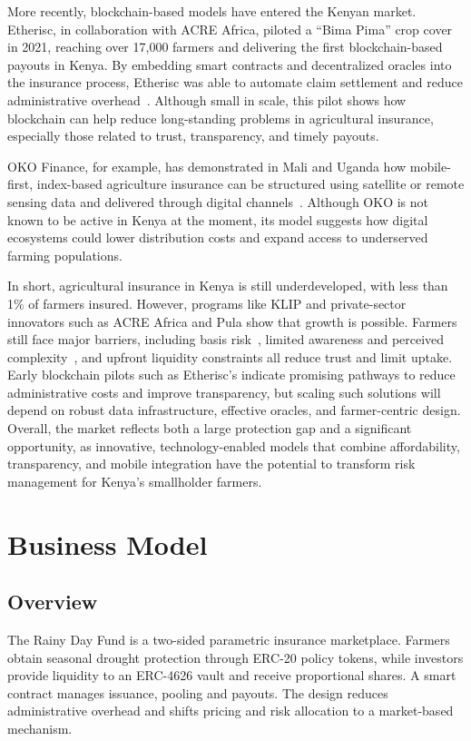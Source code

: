 \documentclass[11pt,a4paper]{article}
\begin{document}
    More recently, blockchain-based models have entered the Kenyan market.
    Etherisc, in collaboration with ACRE Africa, piloted a \enquote{Bima Pima} crop cover in 2021, reaching over 17,000 farmers and delivering the first blockchain-based payouts in Kenya.
    By embedding smart contracts and decentralized oracles into the insurance process, Etherisc was able to automate claim settlement and reduce administrative overhead~\parencite{Etherisc2021}.
    Although small in scale, this pilot shows how blockchain can help reduce long-standing problems in agricultural insurance, especially those related to trust, transparency, and timely payouts.

    OKO Finance, for example, has demonstrated in Mali and Uganda how mobile-first, index-based agriculture insurance can be structured using satellite or remote sensing data and delivered through digital channels~\parencite{ADA_OKOFinance2021}.
    Although OKO is not known to be active in Kenya at the moment, its model suggests how digital ecosystems could lower distribution costs and expand access to underserved farming populations.

    In short, agricultural insurance in Kenya is still underdeveloped, with less than 1\% of farmers insured.
    However, programs like KLIP and private-sector innovators such as ACRE Africa and Pula show that growth is possible.
    Farmers still face major barriers, including basis risk~\parencite{Jensen2016}, limited awareness and perceived complexity~\parencite{Janzen2020}, and upfront liquidity constraints all reduce trust and limit uptake.
    Early blockchain pilots such as Etherisc's indicate promising pathways to reduce administrative costs and improve transparency, but scaling such solutions will depend on robust data infrastructure, effective oracles, and farmer-centric design.
    Overall, the market reflects both a large protection gap and a significant opportunity, as innovative, technology-enabled models that combine affordability, transparency, and mobile integration have the potential to transform risk management for Kenya's smallholder farmers.	

    \section{Business Model}\label{sec:business-model}

    \subsection{Overview}\label{subsec:overview}
    The Rainy Day Fund is a two-sided parametric insurance marketplace.
    Farmers obtain seasonal drought protection through ERC-20 policy tokens, while investors provide liquidity to an ERC-4626 vault and receive proportional shares.
    A smart contract manages issuance, pooling and payouts.
    The design reduces administrative overhead and shifts pricing and risk allocation to a market-based mechanism.
\end{document}
